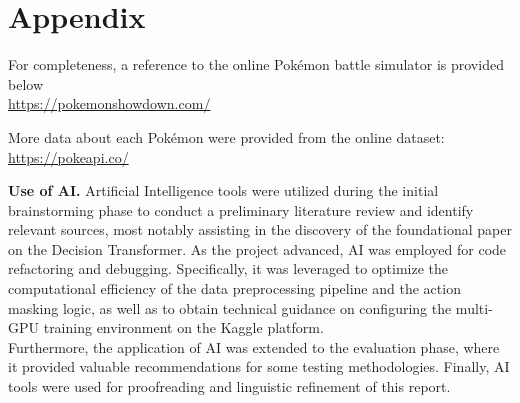 \documentclass{article}
\begin{document}
\section*{Appendix}
For completeness, a reference to the online Pokémon battle simulator is provided below \\ \url{https://pokemonshowdown.com/}


More data about each Pokémon were provided from the online dataset: \\ \url{https://pokeapi.co/}

%
\textbf{Use of AI.}
Artificial Intelligence tools were utilized during the initial brainstorming phase to conduct a preliminary literature review and identify relevant sources, most notably assisting in the discovery of the foundational paper on the Decision Transformer. As the project advanced, AI was employed for code refactoring and debugging. Specifically, it was leveraged to optimize the computational efficiency of the data preprocessing pipeline and the action masking logic, as well as to obtain technical guidance on configuring the multi-GPU training environment on the Kaggle platform.\\
Furthermore, the application of AI was extended to the evaluation phase, where it provided valuable recommendations for some testing methodologies. Finally, AI tools were used for proofreading and linguistic refinement of this report.  
\end{document}

